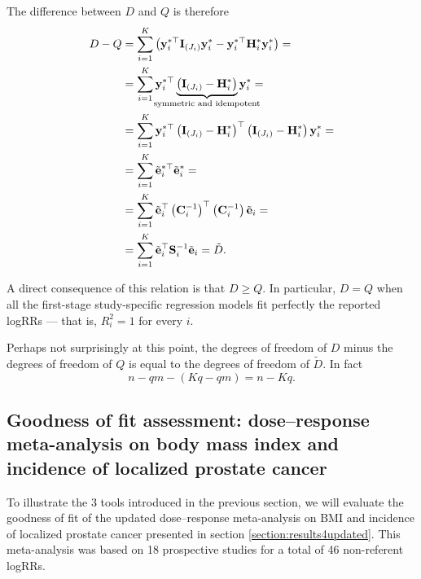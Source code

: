 The difference between $D$ and $Q$ is therefore
\begin{align*}
D-Q &=\sum_{i=1}^K \left( \mathbf{y}_i^{*\top} \mathbf{I}_{(J_i)} \mathbf{y}_i^{*} -  \mathbf{y}_i^{*\top} \mathbf{H}_i^* \mathbf{y}_i^{*} \right) = \\
&=\sum_{i=1}^K \mathbf{y}_i^{*\top}  \underbrace{\left(  \mathbf{I}_{(J_i)} - \mathbf{H}_i^* \right) }_{{\mathclap{\textrm{symmetric and idempotent}}}}  \mathbf{y}_i^{*} = \\
&= \sum_{i=1}^K \mathbf{y}_i^{*\top} \left(  \mathbf{I}_{(J_i)} - \mathbf{H}_i^*  \right)^\top \left(  \mathbf{I}_{(J_i)} - \mathbf{H}_i^*  \right)  \mathbf{y}_i^{*} = \\
&= \sum_{i=1}^K \tilde{\mathbf{e}}_i^{*\top} \tilde{\mathbf{e}}_i^* = \\
&= \sum_{i=1}^K \tilde{\mathbf{e}}_i^\top \left(\mathbf{C}_i^{-1}\right)^\top \left(\mathbf{C}_i^{-1}\right) \tilde{\mathbf{e}}_i = \\
&= \sum_{i=1}^K \tilde{\mathbf{e}}_i^\top \mathbf{S}_i^{-1} \tilde{\mathbf{e}}_i = \tilde{D}.
\end{align*}

A direct consequence of this relation is that $D \ge Q$. In particular, $D = Q$ when all the first-stage study-specific regression models fit perfectly the reported logRRs --- that is, $R_i^2=1$ for every $i$.

Perhaps not surprisingly at this point, the degrees of freedom of $D$ minus the degrees of freedom of $Q$ is equal to the degrees of freedom of $\tilde{D}$. In fact
\begin{equation*}
n-qm - (Kq - qm) = n-Kq.
\end{equation*} 

\subsection{Goodness of fit assessment: dose--response meta-analysis on body mass index and incidence of localized prostate cancer}
\label{sec:examplegof}

To illustrate the 3 tools introduced in the previous section, we will evaluate the goodness of fit of the updated dose--response meta-analysis on BMI and incidence of localized prostate cancer presented in section \ref{section:results4updated}. This meta-analysis was based on 18 prospective studies for a total of 46 non-referent logRRs.

